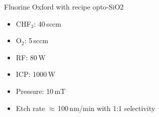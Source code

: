 \item Fluorine Oxford with recipe opto-SiO2
\begin{itemize}
\item CHF$_3$: 40\,sccm
\item O$_2$: 5\,sccm
\item RF: 80\,W
\item ICP: 1000\,W
\item Pressure: 10\,mT
\item Etch rate $\approx$\,100\,nm/min with 1:1 selectivity
\end{itemize}